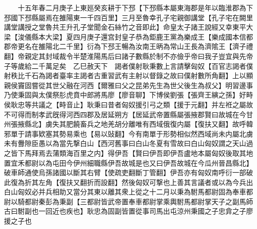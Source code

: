 　　十五年春二月庚子上東廵癸亥耕于下邳【下邳縣本屬東海郡是年以臨淮郡為下邳國下邳縣屬焉在雒陽東一千四百里】三月至魯幸孔子宅親御講堂【孔子宅在闕里講堂講授之堂魯共王升孔子堂聞金石絲竹之音即此】命皇太子諸王說經又幸東平大梁【浚儀縣本大梁】夏四月庚子還宫封皇子恭為鉅鹿王黨為樂成王【樂成國本信都郡帝更名在雒陽北二千里】衍為下邳王暢為汝南王昞為常山王長為濟隂王【濟子禮翻】帝親定其封域裁令半楚淮陽馬后曰諸子數縣於制不亦儉乎帝曰我子豈宜與先帝子等歲給二千萬足矣　乙巳赦天下　謁者僕射耿秉數上言請擊匈奴【百官志謁者僕射秩比千石為謁者臺率主謁者古重習武有主射以督錄之故曰僕射數所角翻】上以顯親侯竇固嘗從其世父融在河西【爾雅曰父之昆弟先生為世父後生為叔父】明習邊事乃使秉固與太僕祭肜虎賁中郎將馬廖【廖音聊】下博侯劉張【張齊王縯之孫】好畤侯耿忠等共議之【畤音止】耿秉曰昔者匈奴援引弓之類【援于元翻】并左袵之屬故不可得而制孝武旣得河西四郡及居延朔方【居延武帝置縣屬張掖郡賢曰故城在今甘州張掖縣北】虜失其肥饒畜兵之地羌胡分離唯有西域俄復内屬【復扶又翻】故呼韓邪單于請事欵塞其勢易乘也【易以䜴翻】今有南單于形勢相似然西域尚未内屬北虜未有釁隙臣愚以為當先撃白山【西河舊事曰白山冬夏有雪故曰白山匈奴謂之天山過之皆下馬拜焉去蒲類海百里之内】得伊吾【賢曰伊吾即伊吾盧地本屬匈奴後取其地置宜禾都尉以為屯田今伊州細職縣伊吾故城是也又曰伊吾故城在今瓜州晉昌縣北】破車師通使烏孫諸國以斷其右臂【使疏吏翻斷丁管翻】伊吾亦有匈奴南呼衍一部破此復為折其左角【復扶又翻折而設翻】然後匈奴可撃也上善其言議者或以為今兵出白山匈奴必并兵相助又當分其東以離其衆上從之十二月以秉為駙馬都尉固為奉車都尉以騎都尉秦彭為秉副【三都尉皆武帝置奉車都尉掌乘輿駙馬都尉掌天子之副馬師古曰駙副也一回近也疾也】耿忠為固副皆置從事司馬出屯涼州秉國之子忠弇之子廖援之子也


